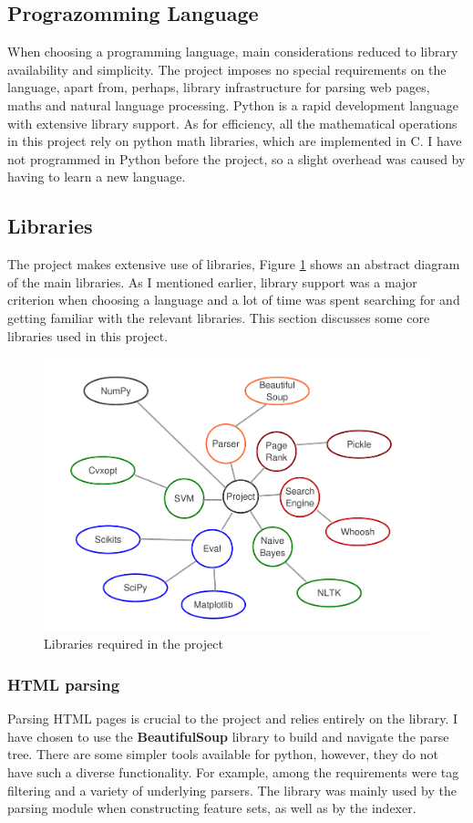 \documentclass[12pt,notitlepage,twoside]{scrreprt}
\begin{document}
\subsection{Prograzomming Language}

When choosing a programming language, main considerations reduced to library availability
and simplicity. The project imposes no special  requirements on the language, apart from,
perhaps, library infrastructure for parsing web pages, maths and natural language
processing.  Python is a rapid development language with extensive library support. As for
efficiency, all the mathematical operations in this project rely on python math libraries,
which are implemented in C. I have not programmed in Python before the project, so a
slight overhead was caused by having to learn a new language.

\subsection{Libraries}
The project makes extensive use of libraries, Figure \ref{libs} shows an abstract diagram
of the main libraries. As I mentioned earlier, library support was a major criterion when
choosing a language and a lot of time was spent searching for and getting familiar with the
relevant libraries. This section discusses some core libraries used in this project.

\begin{figure}[h]
	\centering
	\includegraphics[width=\textwidth]{figs/libs.pdf}
	\caption{Libraries required in the project\label{libs}}
\end{figure}
\subsubsection*{HTML parsing}
Parsing HTML pages is crucial to the project and relies entirely on the library. I have
chosen to use the \textbf{BeautifulSoup} library to build and navigate the parse tree.
There are some simpler tools available for python, however, they do not have such a
diverse functionality. For example, among the requirements were tag filtering and a
variety of underlying parsers. The library was mainly used by the parsing module when
constructing feature sets, as well as by the indexer.
\end{document}
